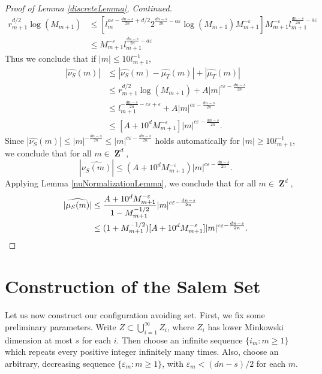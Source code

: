 \documentclass[12pt,reqno]{article}
\DeclareMathOperator{\ZZ}{\mathbf{Z}}
\begin{document}
\begin{proof}[Proof of Lemma \ref{discreteLemma}, Continued]
\begin{align*}
        r_{m+1}^{d/2} \log(M_{m+1}) &\leq \left[ l_m^{a\varepsilon - \frac{dn-s}{2n} + d/2} 2^{\frac{dn-s}{2n} - a \varepsilon} \log(M_{m+1}) M_{m+1}^{-\varepsilon} \right] M_{m+1}^{-\varepsilon} l_{m+1}^{\frac{dn-s}{2n} - a\varepsilon}\\
        &\leq M_{m+1}^{-\varepsilon} l_{m+1}^{\frac{dn-s}{2n} - a \varepsilon}
    \end{align*}
    Thus we conclude that if $|m| \leq 10 l_{m+1}^{-1}$,
    \begin{align*}
        |\widehat{\nu_{S}}(m)| &\leq |\widehat{\nu_{S}}(m) - \widehat{\mu_T}(m)| + |\widehat{\mu_T}(m)|\\
        &\leq r_{m+1}^{d/2} \log(M_{m+1}) + A |m|^{c\varepsilon - \frac{dn-s}{2n}}\\
        &\leq l_{m+1}^{-\frac{dn-s}{2n}-c\varepsilon + \varepsilon} + A|m|^{c\varepsilon - \frac{dn-s}{2n}}\\
        &\leq [A + 10^d M_{m+1}^{-\varepsilon}] |m|^{c\varepsilon - \frac{dn-s}{2n}}.
    \end{align*}
    Since $|\widehat{\nu_{S}}(m)| \leq |m|^{-\frac{dn-s}{2n}} \leq |m|^{c\varepsilon - \frac{dn-s}{2n}}$ holds automatically for $|m| \geq 10l_{m+1}^{-1}$, we conclude that for all $m \in \ZZ^d$,
    \[ |\widehat{\nu_S(m)}| \leq (A + 10^d M_{m+1}^{-\varepsilon}) |m|^{c\varepsilon - \frac{dn-s}{2n}}. \]
    Applying Lemma \ref{nuNormalizationLemma}, we conclude that for all $m \in \ZZ^d$,
    \begin{align*}
        |\widehat{\mu_S(m)}| &\leq \frac{A + 10^d M_{m+1}^{-\varepsilon}}{1 - M_{m+1}^{-1/2}} |m|^{c\varepsilon - \frac{dn-s}{2n}}\\
        &\leq (1 + M_{m+1}^{-1/2}) [A + 10^d M_{m+1}^{-\varepsilon}] |m|^{c\varepsilon - \frac{dn-s}{2n}}. \qedhere
    \end{align*}
\end{proof}

\section{Construction of the Salem Set}

Let us now construct our configuration avoiding set. First, we fix some preliminary parameters. Write $Z \subset \bigcup_{i = 1}^\infty Z_i$, where $Z_i$ has lower Minkowski dimension at most $s$ for each $i$. Then choose an infinite sequence $\{ i_m : m \geq 1 \}$ which repeats every positive integer infinitely many times. Also, choose an arbitrary, decreasing sequence $\{ \varepsilon_m : m \geq 1 \}$, with $\varepsilon_m < (dn - s)/2$ for each $m$.
\end{document}
